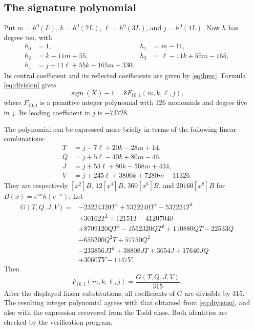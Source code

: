 \documentclass[11pt,reqno,letterpaper]{amsart}
\newcommand{\sgn}{\operatorname{sign}}
\theoremstyle{definition}
\numberwithin{equation}{section}
\begin{document}
\subsection{The signature polynomial}
Put $m=h^0(L)$, $k=h^0(2L)$, $\ell=h^0(3L)$, and $j=h^0(4L)$.
Now $h$ has degree ten, with
\begin{align*}
 h_0&=1,&h_1&=m-11,\\
 h_2&=k-11m+55,&h_3&=\ell-11k+55m-165,\\
 h_4&=j-11\ell+55k-165m+330.
\end{align*}
Its central coefficient and its reflected coefficients are given by
\eqref{eq:hrec}. Formula \eqref{eq:division} gives
\begin{equation}\label{eq:C10F}
 \sgn(X)-1=8F_{10,1}(m,k,\ell,j),
\end{equation}
where $F_{10,1}$ is a primitive integer polynomial with 126 monomials
and degree five in $j$. Its leading coefficient in $j$ is $-73728$.

The polynomial can be expressed more briefly in terms of the following
linear combinations:
\begin{align*}
 T&=j-7\ell+20k-28m+14,\\
 Q&=j+5\ell-40k+80m-46,\\
 J&=j+53\ell+80k-568m+434,\\
 V&=j+245\ell+3800k+7280m-11326.
\end{align*}
They are respectively $[x^2]B$, $12[x^4]B$, $360[x^6]B$,
and $20160[x^8]B$ for $B(x)=e^{5x}h(e^{-x})$.
Let
\begin{align}
G(T,Q,J,V)={}&-23224320T^5+5322240T^4-532224T^3\nonumber\\
 &+30162T^2+12151T-41207040\nonumber\\
 &+8709120QT^3-1552320QT^2+110880QT-22533Q\nonumber\\
 &-655200Q^2T+57750Q^2\nonumber\\
 &-233856JT^2+38808JT+3654J+17640JQ\nonumber\\
 &+3060TV-1147V.\label{eq:C10compact}
\end{align}
Then
\begin{equation}\label{eq:C10division}
 F_{10,1}(m,k,\ell,j)=\frac{G(T,Q,J,V)}{315}.
\end{equation}
After the displayed linear substitutions, all coefficients of $G$ are
divisible by $315$. The resulting integer polynomial agrees with that
obtained from \eqref{eq:division}, and also with the expression
recovered from the Todd class. Both identities are checked by the
verification program.
\end{document}
